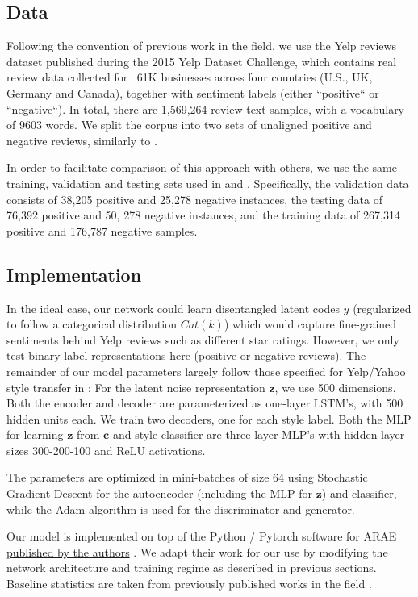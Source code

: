 \documentclass{article}
\newcommand{\vect}[1]{\boldsymbol{#1}}
\begin{document}
\subsection{Data} \label{ssec:data}
Following the convention of previous work in the field, we use the Yelp reviews dataset \cite{yelp} published during the 2015 Yelp Dataset Challenge, which contains real review data collected for ~61K businesses across four countries (U.S., UK, Germany and Canada), together with sentiment labels (either ``positive`` or ``negative``). In total, there are 1,569,264 review text samples, with a vocabulary of 9603 words. We split the corpus into two sets of unaligned positive and negative reviews, similarly to \citeauthor{shen, arae}.


In order to facilitate comparison of this approach with others, we use the same training, validation and testing sets used in \citeauthor{shen} and \citeauthor{arae}. Specifically, the validation data consists of 38,205 positive and 25,278 negative instances, the testing data of 76,392 positive and 50, 278 negative instances, and the training data of 267,314 positive and 176,787 negative samples.

\subsection{Implementation}
In the ideal case, our network could learn disentangled latent codes $y$ (regularized to follow a categorical distribution $Cat(k)$) which would capture fine-grained sentiments behind Yelp reviews such as different star ratings. However, we only test binary label representations here (positive or negative reviews). The remainder of our model parameters largely follow those specified for Yelp/Yahoo style transfer in \citeauthor{arae}: For the latent noise representation $\vect{z}$, we use 500 dimensions. Both the encoder and decoder are parameterized as one-layer LSTM's, with 500 hidden units each. We train two decoders, one for each style label. Both the MLP for learning $\vect{z}$ from $\vect{c}$ and style classifier are three-layer MLP's with hidden layer sizes 300-200-100 and ReLU activations. 

The parameters are optimized in mini-batches of size 64 using Stochastic Gradient Descent for the autoencoder (including the MLP for $\vect{z}$) and classifier, while the Adam algorithm is used for the discriminator and generator.

Our model is implemented on top of the Python / Pytorch software for ARAE \href{https://github.com/jakezhaojb/ARAE}{published by the authors} \cite{arae}. We adapt their work for our use by modifying the network architecture and training regime as described in previous sections. Baseline statistics are taken from previously published works in the field \cite{shen, arae}.
\end{document}
